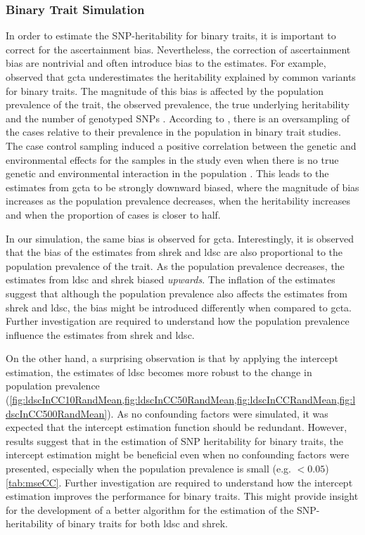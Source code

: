 \documentclass[12pt]{scrbook}
\begin{document}
\subsubsection{Binary Trait Simulation}
In order to estimate the \gls{SNP}-heritability for binary traits, it is important to correct for the ascertainment bias.
Nevertheless, the correction of ascertainment bias are nontrivial and often introduce bias to the estimates. 
For example, \citet{Golan2014} observed that \gls{gcta} underestimates the heritability explained by common variants for binary traits.
The magnitude of this bias is affected by the population prevalence of the trait, the observed prevalence, the true underlying heritability and the number of genotyped \glspl{SNP} \citep{Golan2014}.	
According to \citet{Golan2014}, there is an oversampling of the cases relative to their prevalence in the population in binary trait studies.
The case control sampling induced a positive correlation between the genetic and environmental effects for the samples in the study even when there is no true genetic and environmental interaction in the population \citep{Golan2014}.
This leads to the estimates from \gls{gcta} to be strongly downward biased, where the magnitude of bias increases as the population prevalence decreases, when the heritability increases and when the proportion of cases is closer to half.

In our simulation, the same bias is observed for \gls{gcta}.
Interestingly, it is observed that the bias of the estimates from \gls{shrek} and \gls{ldsc} are also proportional to the population prevalence of the trait.
As the population prevalence decreases, the estimates from \gls{ldsc} and \gls{shrek} biased \emph{upwards}. 
The inflation of the estimates suggest that although the population prevalence also affects the estimates from \gls{shrek} and \gls{ldsc}, the bias might be introduced differently when compared to \gls{gcta}. 
Further investigation are required to understand how the population prevalence influence the estimates from \gls{shrek} and \gls{ldsc}.

On the other hand, a surprising observation is that by applying the intercept estimation, the estimates of \gls{ldsc} becomes more robust to the change in population prevalence (\cref{fig:ldscInCC10RandMean,fig:ldscInCC50RandMean,fig:ldscInCCRandMean,fig:ldscInCC500RandMean}).
As no confounding factors were simulated, it was expected that the intercept estimation function should be redundant.
However, results suggest that in the estimation of \gls{SNP} heritability for binary traits, the intercept estimation might be beneficial even when no confounding factors were presented, especially when the population prevalence is small (e.g. $<0.05$) \cref{tab:mseCC}.
Further investigation are required to understand how the intercept estimation improves the performance for binary traits. 
This might provide insight for the development of a better algorithm for the estimation of the \gls{SNP}-heritability of binary traits for both \gls{ldsc} and \gls{shrek}.
\end{document}
